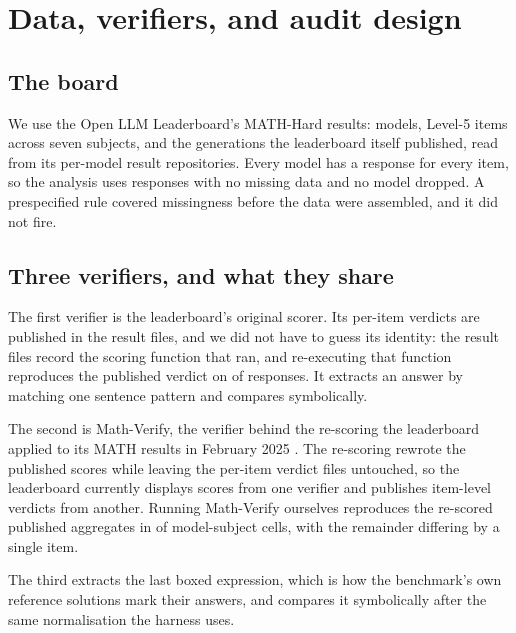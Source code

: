 
\section{Data, verifiers, and audit design}
\label{sec:data}

\subsection{The board}

We use the Open LLM Leaderboard's \citep{openllmleaderboard, fourrier2024openllm} MATH-Hard
\citep{hendrycksmath2021} results: \NumModels{} models, \NumItems{}
Level-5 items across seven subjects, and the generations the leaderboard itself published,
read from its per-model result repositories. Every model has a response for every item, so
the analysis uses \NumRows{} responses with no missing data and no model dropped. A
prespecified rule covered missingness before the data were assembled, and it did not fire.

\subsection{Three verifiers, and what they share}

The first verifier is the leaderboard's original scorer. Its per-item verdicts are published
in the result files, and we did not have to guess its identity: the result files record the
scoring function that ran, and re-executing that function reproduces the published verdict on
\EmReexecItems{} of \EmReexecItems{} responses. It extracts an answer by matching one
sentence pattern and compares symbolically.

The second is Math-Verify, the verifier behind the re-scoring the leaderboard applied to its
MATH results in February 2025 \citep{kydlicek2025fixing}. The re-scoring rewrote the published
scores while leaving the
per-item verdict files untouched, so the leaderboard currently displays scores from one
verifier and publishes item-level verdicts from another. Running Math-Verify ourselves
reproduces the re-scored published aggregates in \MvAggregateMatch{} of
\NumSubjectsRescored{} model-subject cells, with the remainder differing by a single item.

The third extracts the last boxed expression, which is how the benchmark's own reference
solutions mark their answers, and compares it symbolically after the same normalisation the
harness uses.

